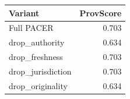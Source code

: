 \begin{tabular}{lr}
\hline
Variant & ProvScore \\
\hline
Full PACER & 0.703 \\
drop\_authority & 0.634 \\
drop\_freshness & 0.703 \\
drop\_jurisdiction & 0.703 \\
drop\_originality & 0.634 \\
\hline
\end{tabular}
